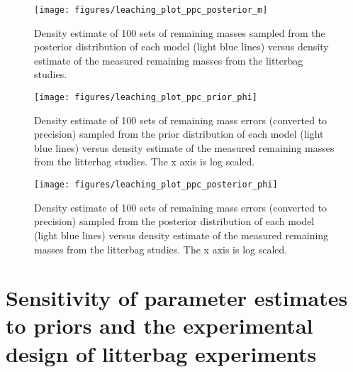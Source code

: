 \documentclass[
  12pt,
]{article}
\begin{document}
\begin{figure}[H]

{\centering \texttt{[image: figures/leaching\_plot\_ppc\_posterior\_m]} 

}

\caption{Density estimate of 100 sets of remaining masses sampled from the posterior distribution of each model (light blue lines) versus density estimate of the measured remaining masses from the litterbag studies.}\label{fig:sup-out-p-sdm-all-models-check-2-1}
\end{figure}



\begin{figure}[H]

{\centering \texttt{[image: figures/leaching\_plot\_ppc\_prior\_phi]} 

}

\caption{Density estimate of 100 sets of remaining mass errors (converted to precision) sampled from the prior distribution of each model (light blue lines) versus density estimate of the measured remaining masses from the litterbag studies. The x axis is log scaled.}\label{fig:sup-out-p-sdm-all-models-check-3-1}
\end{figure}



\begin{figure}[H]

{\centering \texttt{[image: figures/leaching\_plot\_ppc\_posterior\_phi]} 

}

\caption{Density estimate of 100 sets of remaining mass errors (converted to precision) sampled from the posterior distribution of each model (light blue lines) versus density estimate of the measured remaining masses from the litterbag studies. The x axis is log scaled.}\label{fig:sup-out-p-sdm-all-models-check-4-1}
\end{figure}

\hypertarget{sup-11}{%
\section{Sensitivity of parameter estimates to priors and the experimental design of litterbag experiments}\label{sup-11}}
\end{document}
